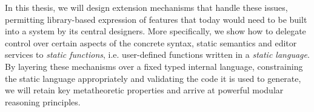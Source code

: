 In this thesis, we will design extension mechanisms that handle these issues, permitting library-based expression of features that today would need to be built into a system by its central designers. More specifically, we show how to delegate control over certain aspects of the concrete syntax, static semantics and editor services to \emph{static functions}, i.e. user-defined functions written in a \emph{static language}. By layering these mechanisms over a fixed typed internal language, constraining the static language appropriately and validating the code it is used to generate, we will retain key  metatheoretic properties and arrive at powerful modular reasoning principles. %


